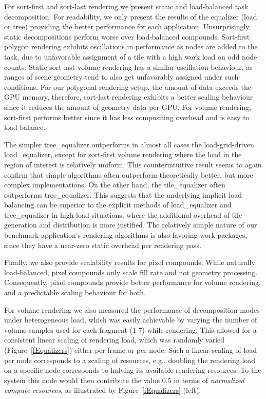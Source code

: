\documentclass[10pt,journal,compsoc]{IEEEtran}
\newcommand{\fig}[1]{Figure~\ref{#1}}
\providecommand{\DIFaddtex}[1]{{\protect\color{blue} \sf #1}} %
\providecommand{\DIFaddbegin}{} %
\providecommand{\DIFaddend}{} %
\providecommand{\DIFadd}[1]{\texorpdfstring{\DIFaddtex{#1}}{#1}} %
\newcommand{\DIFaddincludegraphics}[2][]{{\color{blue}\fbox{\DIFOincludegraphics[#1]{#2}}}} %
\DeclareRobustCommand{\DIFaddbegin}{\DIFOaddbegin \let\includegraphics\DIFaddincludegraphics} %
\DeclareRobustCommand{\DIFaddend}{\DIFOaddend \let\includegraphics\DIFOincludegraphics} %
\begin{document}
For sort-first and sort-last rendering we present static and load-balanced task
decomposition. For readability, we only present the results of the equalizer
(load or tree) providing the better performance for each application.
Unsurprisingly, static decompositions perform worse over load-balanced
compounds. Sort-first polygon rendering exhibits oscillations in performance as
nodes are added to the task, due to unfavorable assignment of a tile with a
high work load on odd node counts. Static sort-last volume rendering has a
similar oscillation behaviour, as ranges of scene geometry tend to also get
unfavorably assigned under such conditions. \DIFaddbegin \DIFadd{For our polygonal rendering setup,
the amount of data exceeds the GPU memory, therefore, sort-last rendering
exhibits a better scaling behaviour since it reduces the amount of geometry
data per GPU. For volume rendering, sort-first performs better since it has
less compositing overhead and is easy to load balance.
}\DIFaddend 

The simpler \textsf{tree\_equalizer} outperforms in almost all cases the
load-grid-driven \textsf{load\_equalizer}, except for sort-first volume
rendering where the load in the region of interest is relatively uniform. This
counterintuitive result seems to again confirm that simple algorithms often
outperform theoretically better, but more complex implementations. On the other
hand, the \textsf{tile\_equalizer} often outperforms \textsf{tree\_equalizer}.
This suggests that the underlying implicit load balancing can be superior to the
explicit methods of \textsf{load\_equalizer} and \textsf{tree\_equalizer} in
high load situations, where the additional overhead of tile generation and
distribution is more justified. The relatively simple nature of our benchmark
application's rendering algorithms is also favoring work packages, since they
have a near-zero static overhead per rendering pass.

Finally, we also provide scalability results for pixel compounds. While
naturally load-balanced, pixel compounds only scale fill rate and not geometry
processing. Consequently, pixel compounds provide better performance for volume
rendering, and a predictable scaling behaviour for both.

For volume rendering we also measured the performance of decomposition modes
under heterogeneous load, which was easily achievable by varying the number of
volume samples used for each fragment (1-7) while rendering. This allowed for a
consistent linear scaling of rendering load, which was randomly varied
(\fig{fEqualizers}) either per frame or per node. Such a linear scaling of load
per node corresponds to a scaling of resources, e.g., doubling the rendering
load on a specific node corresponds to halving its available rendering
resources. To the system this node would then contribute the value 0.5 in terms
of {\em normalized compute resources}, as illustrated by \fig{fEqualizers}
(left).
\end{document}
